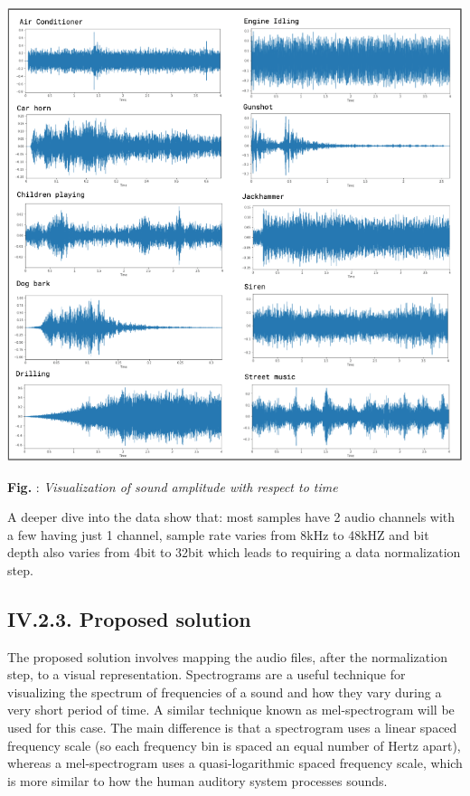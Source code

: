 \documentclass[11pt, a4papper]{report}
\theoremstyle{plain}
\theoremstyle{definition}
\theoremstyle{definition}
\theoremstyle{proposition}
\begin{document}
\begin{center}
\includegraphics[scale=0.6]{sound-waves.png}
\end{center}
\begin{center}
\textbf{Fig. }: \textit{Visualization of sound amplitude with respect to time}
\end{center}

A deeper dive into the data show that: most samples have 2 audio channels with a few having just 1 channel, sample rate varies from 8kHz to 48kHZ and bit depth also varies from 4bit to 32bit which leads to requiring a data normalization step.

\subsection*{IV.2.3. Proposed solution}
The proposed solution involves mapping the audio files, after the normalization step, to a visual representation. Spectrograms are a useful technique for visualizing the spectrum of frequencies of a sound and how they vary during a very short period of time. A similar technique known as mel-spectrogram will be used for this case. The main difference is that a spectrogram uses a linear spaced frequency scale (so each frequency bin is spaced an equal number of Hertz apart), whereas a mel-spectrogram uses a quasi-logarithmic spaced frequency scale, which is more similar to how the human auditory system processes sounds.
\end{document}
